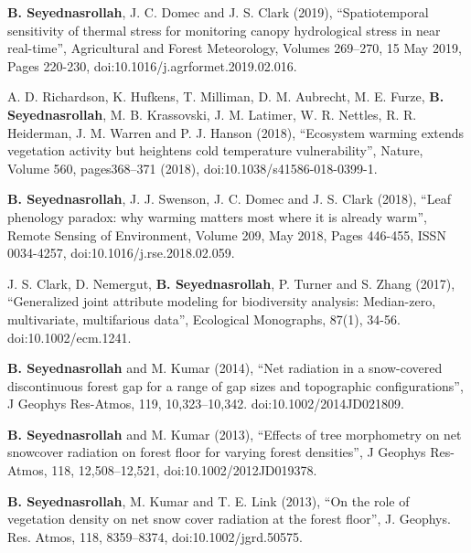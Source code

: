 \documentclass[10pt]{article}
\newenvironment{changemargin}[2]{%
  \begin{list}{}{%
 \setlength{\topsep}{0pt}%
 \setlength{\leftmargin}{#1}%
 \setlength{\rightmargin}{#2}%
 \setlength{\listparindent}{\parindent}%
 \setlength{\itemindent}{\parindent}%
 \setlength{\parsep}{\parskip}%
  }%
  \item[]}{\end{list}
}
\newenvironment{body} {
  \vspace*{-2pt}
  \begin{changemargin}{-0.5in}{-0.5in}
}
{\end{changemargin}
}
\begin{document}
\begin{body}
\begin{etaremune}
    \item \textbf{B. Seyednasrollah}, J. C. Domec and J. S. Clark (2019), ``Spatiotemporal sensitivity of thermal stress for monitoring canopy hydrological stress in near real-time'', Agricultural and Forest Meteorology, Volumes 269–270, 15 May 2019, Pages 220-230, doi:10.1016/j.agrformet.2019.02.016.\\
    \medskip

    \item A. D. Richardson, K. Hufkens, T. Milliman, D. M. Aubrecht, M. E. Furze, \textbf{B. Seyednasrollah}, M. B. Krassovski, J. M. Latimer, W. R. Nettles, R. R. Heiderman, J. M. Warren and P. J. Hanson (2018), ``Ecosystem warming extends vegetation activity but heightens cold temperature vulnerability'', Nature, Volume 560, pages368–371 (2018), doi:10.1038/s41586-018-0399-1.\\
    \medskip

    \item \textbf{B. Seyednasrollah}, J. J. Swenson, J. C. Domec and J. S. Clark (2018), ``Leaf phenology paradox: why warming matters most where it is already warm'', Remote Sensing of Environment, Volume 209, May 2018, Pages 446-455, ISSN 0034-4257, doi:10.1016/j.rse.2018.02.059.\\
    \medskip

    \item J. S. Clark, D. Nemergut, \textbf{B. Seyednasrollah}, P. Turner and S. Zhang (2017), ``Generalized joint attribute modeling for biodiversity analysis: Median-zero, multivariate, multifarious data'', Ecological Monographs, 87(1), 34-56. doi:10.1002/ecm.1241.\\
    \medskip

    \item \textbf{B. Seyednasrollah} and M. Kumar (2014), ``Net radiation in a snow-covered discontinuous forest gap for a range of gap sizes and topographic configurations'', J Geophys Res-Atmos, 119, 10,323–10,342. doi:10.1002/2014JD021809. \\
    \medskip

    \item \textbf{B. Seyednasrollah} and M. Kumar (2013), ``Effects of tree morphometry on net snowcover radiation on forest floor for varying forest densities'', J Geophys Res-Atmos, 118, 12,508–12,521, doi:10.1002/2012JD019378.\\
    \medskip

    \item \textbf{B. Seyednasrollah}, M. Kumar and T. E. Link (2013), ``On the role of vegetation density on net snow cover radiation at the forest floor'', J. Geophys. Res. Atmos, 118, 8359–8374, doi:10.1002/jgrd.50575.\\
    \medskip

  \end{etaremune}

\end{body}
\end{document}
